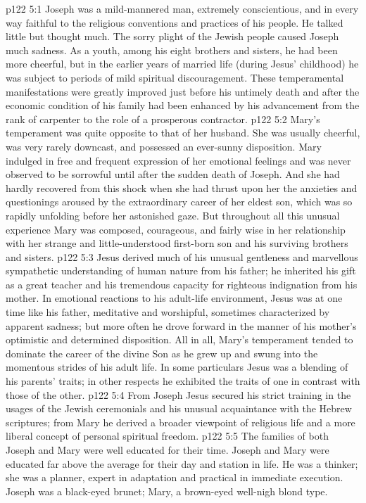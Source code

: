 \vs p122 5:1 Joseph was a mild\hyp{}mannered man, extremely conscientious, and in every way faithful to the religious conventions and practices of his people. He talked little but thought much. The sorry plight of the Jewish people caused Joseph much sadness. As a youth, among his eight brothers and sisters, he had been more cheerful, but in the earlier years of married life (during Jesus’ childhood) he was subject to periods of mild spiritual discouragement. These temperamental manifestations were greatly improved just before his untimely death and after the economic condition of his family had been enhanced by his advancement from the rank of carpenter to the role of a prosperous contractor.
\vs p122 5:2 Mary’s temperament was quite opposite to that of her husband. She was usually cheerful, was very rarely downcast, and possessed an ever\hyp{}sunny disposition. Mary indulged in free and frequent expression of her emotional feelings and was never observed to be sorrowful until after the sudden death of Joseph. And she had hardly recovered from this shock when she had thrust upon her the anxieties and questionings aroused by the extraordinary career of her eldest son, which was so rapidly unfolding before her astonished gaze. But throughout all this unusual experience Mary was composed, courageous, and fairly wise in her relationship with her strange and little\hyp{}understood first\hyp{}born son and his surviving brothers and sisters.
\vs p122 5:3 Jesus derived much of his unusual gentleness and marvellous sympathetic understanding of human nature from his father; he inherited his gift as a great teacher and his tremendous capacity for righteous indignation from his mother. In emotional reactions to his adult\hyp{}life environment, Jesus was at one time like his father, meditative and worshipful, sometimes characterized by apparent sadness; but more often he drove forward in the manner of his mother’s optimistic and determined disposition. All in all, Mary’s temperament tended to dominate the career of the divine Son as he grew up and swung into the momentous strides of his adult life. In some particulars Jesus was a blending of his parents’ traits; in other respects he exhibited the traits of one in contrast with those of the other.
\vs p122 5:4 From Joseph Jesus secured his strict training in the usages of the Jewish ceremonials and his unusual acquaintance with the Hebrew scriptures; from Mary he derived a broader viewpoint of religious life and a more liberal concept of personal spiritual freedom.
\vs p122 5:5 The families of both Joseph and Mary were well educated for their time. Joseph and Mary were educated far above the average for their day and station in life. He was a thinker; she was a planner, expert in adaptation and practical in immediate execution. Joseph was a black\hyp{}eyed brunet; Mary, a brown\hyp{}eyed well\hyp{}nigh blond type.
